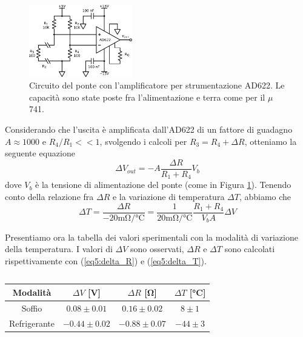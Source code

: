 \begin{figure}
  \begin{center}
    \includegraphics[width=0.40\textwidth]{../E05/latex/c_func_INA.pdf}
  \end{center}
  \caption{Circuito del ponte con l'amplificatore per strumentazione AD622. Le capacità sono state poste fra l'alimentazione e terra come per il $\mu$741.}
  \label{cir5:ad622_ponte}
\end{figure}

Considerando che l'uscita è amplificata dall'AD622 di un fattore di guadagno $A \approx 1000$ e $R_4/R_1<<1$, svolgendo i calcoli per $R_3=R_4+\Delta R$, otteniamo la seguente equazione
\begin{equation}
\Delta V_{out} = - A \frac{\Delta R}{R_1+R_4} V_{b}
\label{eq5:delta_R}
\end{equation}
dove $V_{b}$ è la tensione di alimentazione del ponte (come in Figura \ref{cir5:ad622_ponte}). Tenendo conto della relazione fra $\Delta R$ e la variazione di temperatura $\Delta T$, abbiamo che
\begin{equation}
\Delta T = \frac{\Delta R}{- 20 \si{\milli\ohm/\celsius}} = \frac{1}{20 \si{\milli\ohm/\celsius}} \frac{R_1+R_4}{V_b A} \Delta V
\label{eq5:delta_T}
\end{equation}

Presentiamo ora la tabella dei valori sperimentali con la modalità di variazione della temperatura. I valori di $\Delta V$ sono osservati, $\Delta R$ e $\Delta T$ sono calcolati rispettivamente con (\ref{eq5:delta_R}) e (\ref{eq5:delta_T}).

$$$$

\begin{center}
{\renewcommand{\arraystretch}{1.2}%
	\begin{tabular}{c|c|c|c}
	Modalità & $\Delta V$ [\si{\volt}] & $\Delta R$ [\si{\ohm}] & $\Delta T$ [\si{\celsius}]\\
    \hline
	Soffio & $0.08\pm0.01 $ & $0.16\pm0.02$ & $8 \pm 1$\\
    \hline
	Refrigerante & $-0.44\pm0.02 $ & $-0.88\pm0.07$ & $-44 \pm 3$\\
	\end{tabular}
}
\end{center}

